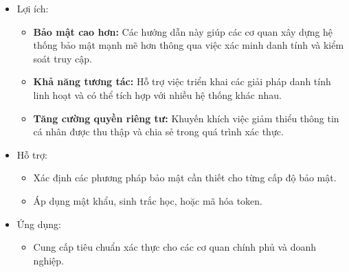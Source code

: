 \begin{itemize}
\begin{itemize}
    \end{itemize}
    \item Lợi ích:
    \begin{itemize}
        \item \textbf{Bảo mật cao hơn:} Các hướng dẫn này giúp các cơ quan xây dựng hệ thống bảo mật mạnh mẽ hơn thông qua việc xác minh danh tính và kiểm soát truy cập.
        \item \textbf{Khả năng tương tác:} Hỗ trợ việc triển khai các giải pháp danh tính linh hoạt và có thể tích hợp với nhiều hệ thống khác nhau.
        \item \textbf{Tăng cường quyền riêng tư:} Khuyến khích việc giảm thiểu thông tin cá nhân được thu thập và chia sẻ trong quá trình xác thực.
    \end{itemize}
    \item Hỗ trợ:
    \begin{itemize}
        \item Xác định các phương pháp bảo mật cần thiết cho từng cấp độ bảo mật.
        \item Áp dụng mật khẩu, sinh trắc học, hoặc mã hóa token.
    \end{itemize}
    \item Ứng dụng:
    \begin{itemize}
        \item Cung cấp tiêu chuẩn xác thực cho các cơ quan chính phủ và doanh nghiệp.
    \end{itemize}
\end{itemize}